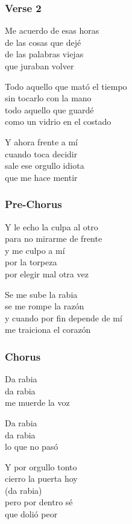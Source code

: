 \documentclass[]{article}
\begin{document}
\subsubsection{Verse 2}\label{verse-2-13}

Me acuerdo de esas horas\\
de las cosas que dejé\\
de las palabras viejas\\
que juraban volver

Todo aquello que mató el tiempo\\
sin tocarlo con la mano\\
todo aquello que guardé\\
como un vidrio en el costado

Y ahora frente a mí\\
cuando toca decidir\\
sale ese orgullo idiota\\
que me hace mentir

\subsubsection{Pre-Chorus}\label{pre-chorus-27}

Y le echo la culpa al otro\\
para no mirarme de frente\\
y me culpo a mí\\
por la torpeza\\
por elegir mal otra vez

Se me sube la rabia\\
se me rompe la razón\\
y cuando por fin depende de mí\\
me traiciona el corazón

\subsubsection{Chorus}\label{chorus-43}

Da rabia\\
da rabia\\
me muerde la voz

Da rabia\\
da rabia\\
lo que no pasó

Y por orgullo tonto\\
cierro la puerta hoy\\
(da rabia)\\
pero por dentro sé\\
que dolió peor
\end{document}
